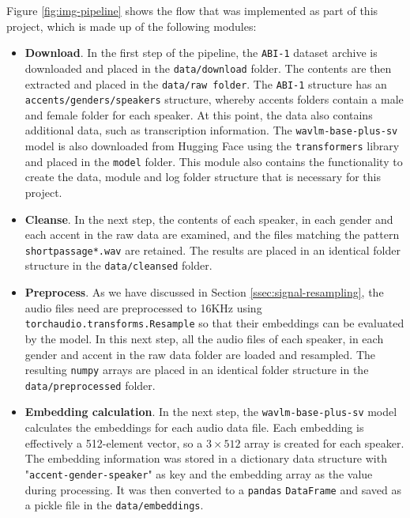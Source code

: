 \documentclass[conference]{IEEEtran}
\begin{document}
Figure \ref{fig:img-pipeline} shows the flow that was implemented as part of this project, which is made up of the following modules:
\begin{itemize}
	\item \textbf{Download}. In the first step of the pipeline, the \texttt{ABI-1} dataset archive is downloaded and placed in the \texttt{data/download} folder. The contents are then extracted and placed in the \texttt{data/raw folder}. The \texttt{ABI-1} structure has an \texttt{accents/genders/speakers} structure, whereby accents folders contain a male and female folder for each speaker. At this point, the data also contains additional data, such as transcription information.
	The \texttt{wavlm-base-plus-sv} model is also downloaded from Hugging Face using the \texttt{transformers} library and placed in the \texttt{model} folder.
	This module also contains the functionality to create the data, module and log folder structure that is necessary for this project.
	
	\item \textbf{Cleanse}. In the next step, the contents of each speaker, in each gender and each accent in the raw data are examined, and the files matching the pattern \texttt{shortpassage*.wav} are retained. The results are placed in an identical folder structure in the \texttt{data/cleansed} folder.
	
	\item \textbf{Preprocess}. As we have discussed in Section \ref{ssec:signal-resampling}, the audio files need are preprocessed to 16KHz using \texttt{torchaudio.transforms.Resample} so that their embeddings can be evaluated by the model. In this next step, all the audio files of each speaker, in each gender and accent in the raw data folder are loaded and resampled. The resulting \texttt{numpy} arrays are placed in an identical folder structure in the \texttt{data/preprocessed} folder.
	
	\item \textbf{Embedding calculation}. In the next step, the \texttt{wavlm-base-plus-sv} model calculates the embeddings for each audio data file. Each embedding is effectively a 512-element vector, so a $3 \times 512$ array is created for each speaker. The embedding information was stored in a dictionary data structure with "\texttt{accent-gender-speaker}" as key and the embedding array as the value during processing. It was then converted to a \texttt{pandas} \texttt{DataFrame} and saved as a pickle file in the \texttt{data/embeddings}.
	

\end{itemize}
\end{document}
